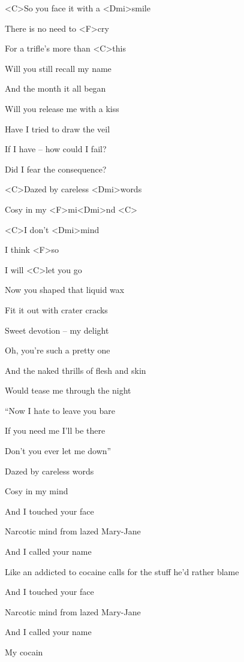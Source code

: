 

\zs

<C>So you face it with a <Dmi>smile 

There is no need to <F>cry

For a trifle's more than <C>this
\ks

\zs
Will you still recall my name

And the month it all began

Will you release me with a kiss
\ks

\zs
Have I tried to draw the veil

If I have -- how could I fail?

Did I fear the consequence?
\ks

\zr
<C>Dazed by careless <Dmi>words 

Cosy in my <F>mi<Dmi>nd <C> 

<C>I don't <Dmi>mind 

I think <F>so 

I will <C>let you go
\kr

\zs
Now you shaped that liquid wax

Fit it out with crater cracks

Sweet devotion -- my delight
\ks

\zs
Oh, you're such a pretty one

And the naked thrills of flesh and skin

Would tease me through the night
\ks

\zs
``Now I hate to leave you bare

If you need me I'll be there

Don't you ever let me down''
\ks

\zs
Dazed by careless words

Cosy in my mind
\ks

\zs
And I touched your face

Narcotic mind from lazed Mary-Jane
\ks

\zs
And I called your name

Like an addicted to cocaine calls for the stuff he'd rather blame
\ks

\zs
And I touched your face

Narcotic mind from lazed Mary-Jane
\ks

\zs
And I called your name

My cocain 
\ks

\kp
